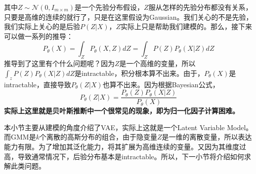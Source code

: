 \documentclass[a4paper]{article}
\begin{document}
其中$Z\sim \mathcal{N}(0,I_{m\times m})$是一个先验分布假设，$Z$服从怎样的先验分布都没有关系，只要是高维的连续的就行了，只是在这里假设为Gaussian。我们关心的不是先验，我们实际上关心的是后验$P(Z|X)$，$Z$实际上只是帮助我们建模的。那么，接下来可以做一系列的推导：
\begin{equation}
    P_\theta(X) = \int_Z P_\theta(X,Z)dZ = \int_Z P(Z)P_\theta(X|Z) dZ
\end{equation}
推导到了这里有个什么问题呢？因为$Z$是一个高维的变量，所以$\int_z P(Z)P_\theta(X|Z) dZ$是intractable，积分根本算不出来。由于，$P_\theta(X)$是intractable，直接导致$P_\theta(Z|X)$也算不出来。因为根据Bayesian公式，
\begin{equation}
    P_\theta(Z|X) = \frac{P_\theta(Z)P_\theta(X|Z)}{P_\theta(X)}
\end{equation}
\textbf{实际上这里就是贝叶斯推断中一个很常见的现象，即为归一化因子计算困难。}

本小节主要从建模的角度介绍了VAE，实际上这就是一个Latent Variable Model。而GMM是$k$个离散的高斯分布的组合，由于隐变量$Z$是一维的离散变量，所以表达能力有限。为了增加其泛化能力，将其扩展为高维连续的变量。又因为其维度过高，导致通常情况下，后验分布基本是intractable。所以，下一小节将介绍如何求解此类问题。
\end{document}

